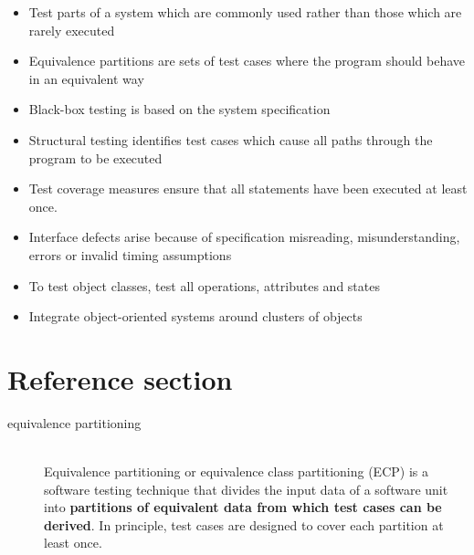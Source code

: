 \documentclass{article}
\begin{document}
\begin{itemize}
  \item Test parts of a system which are commonly used rather than those which are rarely executed 
  \item Equivalence partitions are sets of test cases where the program should behave in an equivalent way 
  \item Black-box testing is based on the system specification 
  \item Structural testing identifies test cases which cause all paths through the program to be executed
  \item Test coverage measures ensure that all statements have been executed at least once. 
  \item Interface defects arise because of specification misreading, misunderstanding, errors or invalid timing assumptions 
  \item To test object classes, test all operations, attributes and states 
  \item Integrate object-oriented systems around clusters of objects
\end{itemize}

\pagebreak
\section*{Reference section} \label{sec:reference}
\begin{description}
	\item[equivalence partitioning] \hfill \\ Equivalence partitioning or equivalence class partitioning (ECP) is a software testing technique that divides the input data of a software unit into \textbf{partitions of equivalent data from which test cases can be derived}. In principle, test cases are designed to cover each partition at least once.
\end{description}
\end{document}

